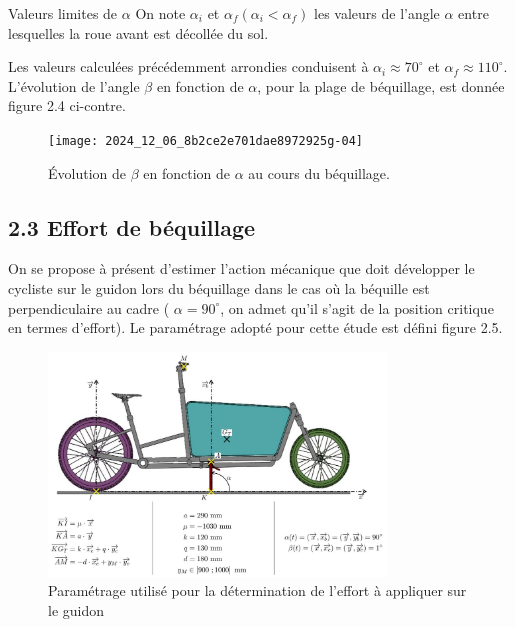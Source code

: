 Valeurs limites de \(\alpha\) On note \(\alpha_{i}\) et \(\alpha_{f}\left(\alpha_{i}<\alpha_{f}\right)\) les valeurs de l'angle \(\alpha\) entre lesquelles la roue avant est décollée du sol.


Les valeurs calculées précédemment arrondies conduisent à \(\alpha_{i} \approx 70^{\circ}\) et \(\alpha_{f} \approx 110^{\circ}\). L'évolution de l'angle \(\beta\) en fonction de \(\alpha\), pour la plage de béquillage, est donnée figure 2.4 ci-contre.


\begin{figure}[!htb]
\begin{center}
\texttt{[image: 2024\_12\_06\_8b2ce2e701dae8972925g-04]}
\caption{Évolution de \(\beta\) en fonction de \(\alpha\) au cours du béquillage. \label{fig2.3}}
\end{center}
\end{figure}

\subsection*{2.3 Effort de béquillage}
On se propose à présent d'estimer l'action mécanique que doit développer le cycliste sur le guidon lors du béquillage dans le cas où la béquille est perpendiculaire au cadre ( \(\alpha=90^{\circ}\), on admet qu'il s'agit de la position critique en termes d'effort). Le paramétrage adopté pour cette étude est défini figure 2.5.\\

\begin{figure}[!htb]
\begin{center}
\includegraphics[width=0.8\textwidth]{images/2024_12_06_8b2ce2e701dae8972925g-05}
\caption{Paramétrage utilisé pour la détermination de l'effort à appliquer sur le guidon \label{fig2.4}}
\end{center}
\end{figure}

